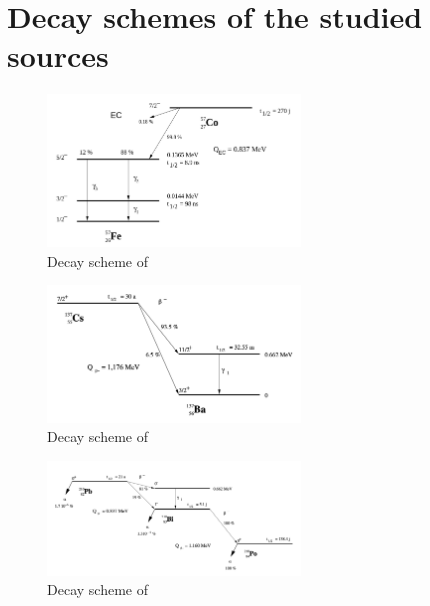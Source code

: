 \section{Decay schemes of the studied sources}
\label{sec:decay_schemes}
\begin{figure}[htbp]
    \centering
    \includegraphics[width=0.6\textwidth]{figures/decay_cobalt57.png}
    \caption{Decay scheme of \cobalt \cite{notice_VI}}
    \label{fig:cobalt_decay}
\end{figure}

\begin{figure}[htbp]
    \centering
    \includegraphics[width=0.6\textwidth]{figures/decay_cesium137.png}
    \caption{Decay scheme of \cesium \cite{notice_VI}}
    \label{fig:cesium_decay}
\end{figure}

\begin{figure}[htbp]
    \centering
    \includegraphics[width=0.6\textwidth]{figures/decay_lead210.png}
    \caption{Decay scheme of \lead \cite{notice_VI}}
    \label{fig:lead_decay}
\end{figure}

